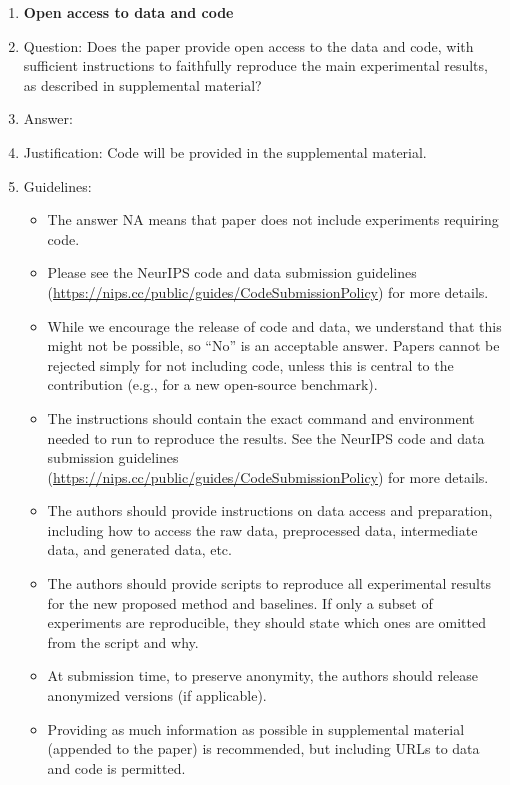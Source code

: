 \documentclass{article}
\begin{document}
\begin{enumerate}
\item {\bf Open access to data and code}
    \item[] Question: Does the paper provide open access to the data and code, with sufficient instructions to faithfully reproduce the main experimental results, as described in supplemental material?
    \item[] Answer: \answerYes{} %
    \item[] Justification: Code will be provided in the supplemental material.
    \item[] Guidelines:
    \begin{itemize}
        \item The answer NA means that paper does not include experiments requiring code.
        \item Please see the NeurIPS code and data submission guidelines (\url{https://nips.cc/public/guides/CodeSubmissionPolicy}) for more details.
        \item While we encourage the release of code and data, we understand that this might not be possible, so “No” is an acceptable answer. Papers cannot be rejected simply for not including code, unless this is central to the contribution (e.g., for a new open-source benchmark).
        \item The instructions should contain the exact command and environment needed to run to reproduce the results. See the NeurIPS code and data submission guidelines (\url{https://nips.cc/public/guides/CodeSubmissionPolicy}) for more details.
        \item The authors should provide instructions on data access and preparation, including how to access the raw data, preprocessed data, intermediate data, and generated data, etc.
        \item The authors should provide scripts to reproduce all experimental results for the new proposed method and baselines. If only a subset of experiments are reproducible, they should state which ones are omitted from the script and why.
        \item At submission time, to preserve anonymity, the authors should release anonymized versions (if applicable).
        \item Providing as much information as possible in supplemental material (appended to the paper) is recommended, but including URLs to data and code is permitted.
    \end{itemize}



\end{enumerate}
\end{document}
